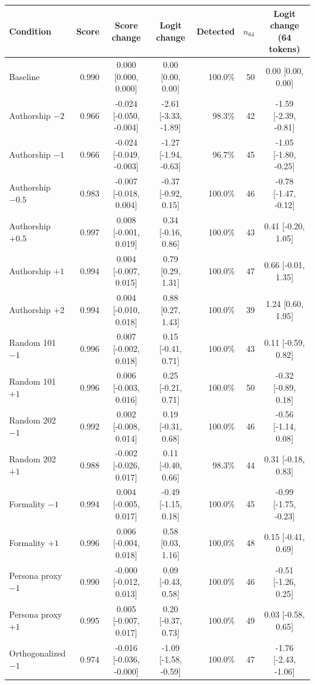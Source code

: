 \begin{tabular}{lrccrrc}
\toprule
Condition & Score & Score change & Logit change & Detected & $n_{64}$ & Logit change (64 tokens) \\
\midrule
Baseline & 0.990 & 0.000 [0.000, 0.000] & 0.00 [0.00, 0.00] & 100.0\% & 50 & 0.00 [0.00, 0.00] \\
Authorship $-2$ & 0.966 & -0.024 [-0.050, -0.004] & -2.61 [-3.33, -1.89] & 98.3\% & 42 & -1.59 [-2.39, -0.81] \\
Authorship $-1$ & 0.966 & -0.024 [-0.049, -0.003] & -1.27 [-1.94, -0.63] & 96.7\% & 45 & -1.05 [-1.80, -0.25] \\
Authorship $-0.5$ & 0.983 & -0.007 [-0.018, 0.004] & -0.37 [-0.92, 0.15] & 100.0\% & 46 & -0.78 [-1.47, -0.12] \\
Authorship $+0.5$ & 0.997 & 0.008 [-0.001, 0.019] & 0.34 [-0.16, 0.86] & 100.0\% & 43 & 0.41 [-0.20, 1.05] \\
Authorship $+1$ & 0.994 & 0.004 [-0.007, 0.015] & 0.79 [0.29, 1.31] & 100.0\% & 47 & 0.66 [-0.01, 1.35] \\
Authorship $+2$ & 0.994 & 0.004 [-0.010, 0.018] & 0.88 [0.27, 1.43] & 100.0\% & 39 & 1.24 [0.60, 1.95] \\
Random 101 $-1$ & 0.996 & 0.007 [-0.002, 0.018] & 0.15 [-0.41, 0.71] & 100.0\% & 43 & 0.11 [-0.59, 0.82] \\
Random 101 $+1$ & 0.996 & 0.006 [-0.003, 0.016] & 0.25 [-0.21, 0.71] & 100.0\% & 50 & -0.32 [-0.89, 0.18] \\
Random 202 $-1$ & 0.992 & 0.002 [-0.008, 0.014] & 0.19 [-0.31, 0.68] & 100.0\% & 46 & -0.56 [-1.14, 0.08] \\
Random 202 $+1$ & 0.988 & -0.002 [-0.026, 0.017] & 0.11 [-0.40, 0.66] & 98.3\% & 44 & 0.31 [-0.18, 0.83] \\
Formality $-1$ & 0.994 & 0.004 [-0.005, 0.017] & -0.49 [-1.15, 0.18] & 100.0\% & 45 & -0.99 [-1.75, -0.23] \\
Formality $+1$ & 0.996 & 0.006 [-0.004, 0.018] & 0.58 [0.03, 1.16] & 100.0\% & 48 & 0.15 [-0.41, 0.69] \\
Persona proxy $-1$ & 0.990 & -0.000 [-0.012, 0.013] & 0.09 [-0.43, 0.58] & 100.0\% & 46 & -0.51 [-1.26, 0.25] \\
Persona proxy $+1$ & 0.995 & 0.005 [-0.007, 0.017] & 0.20 [-0.37, 0.73] & 100.0\% & 49 & 0.03 [-0.58, 0.65] \\
Orthogonalized $-1$ & 0.974 & -0.016 [-0.036, -0.000] & -1.09 [-1.58, -0.59] & 100.0\% & 47 & -1.76 [-2.43, -1.06] \\

\end{tabular}
